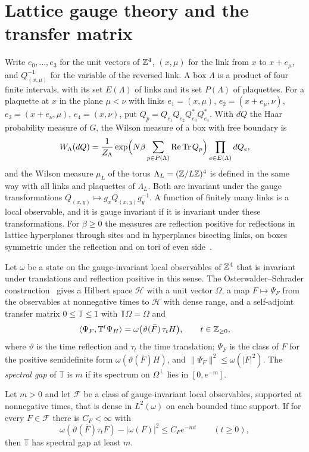 \section{Lattice gauge theory and the transfer matrix}\label{sec:lattice}

Write $e_0,\dots,e_3$ for the unit vectors of $\mathbb{Z}^4$, $(x,\mu)$ for the link
from $x$ to $x+e_\mu$, and $Q_{(x,\mu)}^{-1}$ for the variable of the reversed
link. A box $\Lambda$ is a product of four finite intervals, with its set
$E(\Lambda)$ of links and its set $P(\Lambda)$ of plaquettes. For a plaquette
at $x$ in the plane $\mu<\nu$ with links $e_1=(x,\mu)$, $e_2=(x+e_\mu,\nu)$,
$e_3=(x+e_\nu,\mu)$, $e_4=(x,\nu)$, put $Q_p=Q_{e_1}Q_{e_2}Q_{e_3}^*Q_{e_4}^*$.
With $dQ$ the Haar probability measure of $G$, the Wilson measure of a box
with free boundary is
\[
W_\Lambda(dQ)=\frac1{Z_\Lambda}\exp\Bigl(N\beta\sum_{p\in P(\Lambda)}\operatorname{Re}\operatorname{Tr}
Q_p\Bigr)\prod_{e\in E(\Lambda)}dQ_e ,
\]
and the Wilson measure $\mu_L$ of the torus $\Lambda_L=(\mathbb{Z}/L\mathbb{Z})^4$ is defined
in the same way with all links and plaquettes of $\Lambda_L$. Both are
invariant under the gauge transformations $Q_{(x,y)}\mapsto g_xQ_{(x,y)}
g_y^{-1}$. A function of finitely many links is a local observable, and it
is gauge invariant if it is invariant under these transformations. For
$\beta\ge0$ the measures are reflection positive for reflections in lattice
hyperplanes through sites and in hyperplanes bisecting links, on boxes
symmetric under the reflection and on tori of even side~\cite{OSei78}.

Let $\omega$ be a state on the gauge-invariant local observables of $\mathbb{Z}^4$
that is invariant under translations and reflection positive in this sense.
The Osterwalder--Schrader construction~\cite{OS73,OS75,OSei78} gives a
Hilbert space $\mathcal H$ with a unit vector $\Omega$, a map $F\mapsto\Psi_F$
from the observables at nonnegative times to $\mathcal H$ with dense range,
and a self-adjoint transfer matrix $0\le\mathbb T\le1$ with $\mathbb T\Omega=
\Omega$ and
\[
\langle \Psi_F,\mathbb T^t\Psi_H\rangle=\omega\bigl(\vartheta(\bar F)\,\tau_tH\bigr),
\qquad t\in\mathbb{Z}_{\ge0},
\]
where $\vartheta$ is the time reflection and $\tau_t$ the time translation;
$\Psi_F$ is the class of $F$ for the positive semidefinite form
$\omega(\vartheta(\bar F)H)$, and $\|\Psi_F\|^2\le\omega(|F|^2)$. The
\emph{spectral gap} of $\mathbb T$ is $m$ if its spectrum on $\Omega^\perp$
lies in $[0,e^{-m}]$.

\begin{proposition}\label{prop:gapdecay}
Let $m>0$ and let $\mathcal F$ be a class of gauge-invariant local
observables, supported at nonnegative times, that is dense in $L^2(\omega)$
on each bounded time support. If for every $F\in\mathcal F$ there is
$C_F<\infty$ with
\[
\omega(\vartheta(\bar F)\tau_tF)-|\omega(F)|^2\le C_Fe^{-mt}\qquad(t\ge0),
\]
then $\mathbb T$ has spectral gap at least $m$.
\end{proposition}

